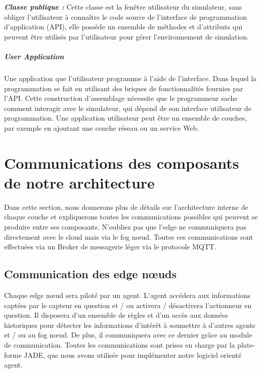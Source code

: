 \textbf{\textit{Classe publique :}} Cette classe est la fenêtre utilisateur du simulateur, sans obliger l'utilisateur à connaître le code source de  l'interface de programmation d’application (API), elle possède un ensemble de méthodes et d'attributs qui peuvent être utilisés par l'utilisateur pour gérer l'environnement de simulation.


\subparagraph{User Application} Une application que l'utilisateur programme à l'aide de l'interface. Dans lequel la programmation se fait en utilisant des briques de fonctionnalités fournies par l’API. Cette construction d'assemblage nécessite que le programmeur sache comment interagir avec le simulateur, qui dépend de son interface utilisateur de programmation. Une application utilisateur peut être un ensemble de couches, par exemple en ajoutant une couche réseau ou un service Web.
\section{Communications  des composants de notre architecture}
Dans cette section, nous donnerons plus de détails sur l'architecture interne de chaque couche et expliquerons toutes les communications possibles qui peuvent se produire entre ses composants. N'oubliez pas que l’edge ne communiquera pas directement avec le cloud mais via le fog nœud. Toutes ces communications sont effectuées via un Broker de messagerie léger via le protocole MQTT.
\subsection{Communication des edge nœuds}
Chaque edge nœud sera piloté par un agent. L'agent accédera aux informations captées par le capteur en question et / ou activera / désactivera l'actionneur en question. Il disposera d'un ensemble de règles et d'un accès aux données historiques pour détecter les informations d'intérêt à soumettre à d'autres agents et / ou au fog nœud. De plus, il communiquera avec ce dernier grâce au module de communication. Toutes les communications sont prises en charge par la plate-forme JADE, que nous avons utilisée pour implémenter notre logiciel orienté agent.

